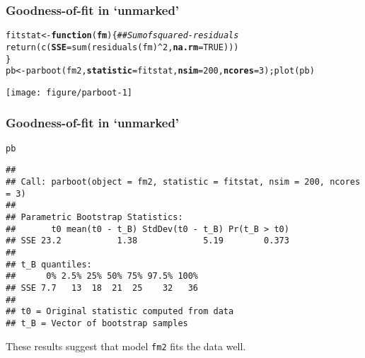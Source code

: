 \documentclass[color=usenames,dvipsnames]{beamer}\usepackage[]{graphicx}\usepackage[]{xcolor}
\makeatletter
\newcommand{\hlnum}[1]{\textcolor[rgb]{0.69,0.494,0}{#1}}%
\newcommand{\hlcom}[1]{\textcolor[rgb]{0.514,0.506,0.514}{\textit{#1}}}%
\newcommand{\hlopt}[1]{\textcolor[rgb]{0,0,0}{#1}}%
\newcommand{\hldef}[1]{\textcolor[rgb]{0,0,0}{#1}}%
\newcommand{\hlkwa}[1]{\textcolor[rgb]{0,0,0}{\textbf{#1}}}%
\newcommand{\hlkwb}[1]{\textcolor[rgb]{0,0.341,0.682}{#1}}%
\newcommand{\hlkwc}[1]{\textcolor[rgb]{0,0,0}{\textbf{#1}}}%
\newcommand{\hlkwd}[1]{\textcolor[rgb]{0.004,0.004,0.506}{#1}}%
\newenvironment{kframe}{%
 \def\at@end@of@kframe{}%
 \ifinner\ifhmode%
  \def\at@end@of@kframe{\end{minipage}}%
  \begin{minipage}{\columnwidth}%
 \fi\fi%
 \def\FrameCommand##1{\hskip\@totalleftmargin \hskip-\fboxsep
 \colorbox{shadecolor}{##1}\hskip-\fboxsep
     \hskip-\linewidth \hskip-\@totalleftmargin \hskip\columnwidth}%
 \MakeFramed {\advance\hsize-\width
   \@totalleftmargin\z@ \linewidth\hsize
   \@setminipage}}%
 {\par\unskip\endMakeFramed%
 \at@end@of@kframe}
\newenvironment{knitrout}{}{} %
\let\hlstd\hldef
\newcommand{\inr}[1]{\colorbox{inlinecolor}{\texttt{#1}}}
\makeatother
\begin{document}
\begin{frame}[fragile]
  \frametitle{Goodness-of-fit in `unmarked'}
\begin{knitrout}\scriptsize
{}\color{fgcolor}\begin{kframe}
\begin{alltt}
\hlstd{fitstat} \hlkwb{<-} \hlkwa{function}\hlstd{(}\hlkwc{fm}\hlstd{) \{} \hlcom{## Sum of squared-residuals}
    \hlkwd{return}\hlstd{(}\hlkwd{c}\hlstd{(}\hlkwc{SSE}\hlstd{=}\hlkwd{sum}\hlstd{(}\hlkwd{residuals}\hlstd{(fm)}\hlopt{^}\hlnum{2}\hlstd{,} \hlkwc{na.rm}\hlstd{=}\hlnum{TRUE}\hlstd{)))}
\hlstd{\}}
\hlstd{pb} \hlkwb{<-} \hlkwd{parboot}\hlstd{(fm2,} \hlkwc{statistic}\hlstd{=fitstat,} \hlkwc{nsim}\hlstd{=}\hlnum{200}\hlstd{,} \hlkwc{ncores}\hlstd{=}\hlnum{3}\hlstd{);} \hlkwd{plot}\hlstd{(pb)}
\end{alltt}


{\ttfamily\noindent\itshape\color{messagecolor}{\#\# Running parametric bootstrap in parallel on 3 cores.}}\end{kframe}

{\centering \texttt{[image: figure/parboot-1]} 

}


\end{knitrout}
\end{frame}



\begin{frame}[fragile]
  \frametitle{Goodness-of-fit in `unmarked'}
\begin{knitrout}\scriptsize
{}\color{fgcolor}\begin{kframe}
\begin{alltt}
\hldef{pb}
\end{alltt}
\begin{verbatim}
## 
## Call: parboot(object = fm2, statistic = fitstat, nsim = 200, ncores = 3)
## 
## Parametric Bootstrap Statistics:
##       t0 mean(t0 - t_B) StdDev(t0 - t_B) Pr(t_B > t0)
## SSE 23.2           1.38             5.19        0.373
## 
## t_B quantiles:
##      0% 2.5% 25% 50% 75% 97.5% 100%
## SSE 7.7   13  18  21  25    32   36
## 
## t0 = Original statistic computed from data
## t_B = Vector of bootstrap samples
\end{verbatim}
\end{kframe}
\end{knitrout}
\vfill
These results suggest that model \inr{fm2} fits the data well.
\end{frame}
\end{document}
